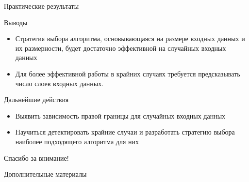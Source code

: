 \documentclass{beamer}
\begin{document}
\begin{frame}{Практические результаты}
\begin{block}{Выводы}
\begin{itemize}
	\item Стратегия выбора алгоритма, основывающаяся на размере входных данных и их размерности, будет достаточно эффективной на случайных входных данных
	\item Для более эффективной работы в крайних случаях требуется предсказывать число слоев входных данных. 
\end{itemize}
\end{block}
\end{frame}


\begin{frame}{Дальнейшие действия}
\begin{itemize}
	\item Выявить зависимость правой границы для случайных входных данных
	\item Научиться детектировать крайние случаи и разработать стратегию выбора наиболее подходящего алгоритма для них
\end{itemize}
\end{frame}


\begin{frame}{}
\begin{center}
Спасибо за внимание!
\end{center}
\end{frame}

\appendix

\begin{frame}{Дополнительные материалы}

\end{frame}
\end{document}
